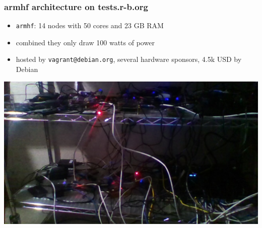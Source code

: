 \documentclass[14pt]{beamer}
\begin{document}
\begin{frame}
 \frametitle{armhf architecture on tests.r-b.org}

 \begin{itemize}
  \item \texttt{armhf}: 14 nodes with 50 cores and 23 GB RAM
  \item combined they only draw 100 watts of power
  \item hosted by \texttt{vagrant@debian.org}, several hardware sponsors, 4.5k USD by Debian
 \end{itemize}
 \begin{center}
  \includegraphics[height=0.5\paperheight]{images/2016-01-26-180836.jpg}
  \vfill
 \end{center}
\end{frame}
\end{document}
